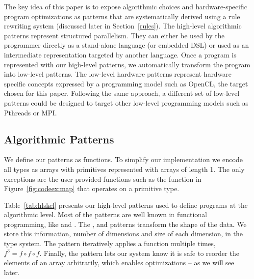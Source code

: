 
The key idea of this paper is to expose algorithmic choices and hardware-specific program optimizations as patterns that are systematically derived using a rule rewriting system (discussed later in Section~\ref{rules}).
The high-level algorithmic patterns represent structured parallelism.
They can either be used by the programmer directly as a stand-alone language (or embedded DSL) or used as an intermediate representation targeted by another language.
Once a program is represented with our high-level patterns, we automatically transform the program into low-level patterns.
The low-level hardware patterns represent hardware specific concepts expressed by a programming model such as OpenCL, the target chosen for this paper.
Following the same approach, a different set of low-level patterns could be designed to target other low-level programming models such as Pthreads or MPI.


\subsection{Algorithmic Patterns}

We define our patterns as functions. %
To simplify our implementation we encode all types as arrays with primitives represented with arrays of length 1.
The only exceptions are the user-provided functions such as the  function in Figure~\ref{fig:codeex:map} that operates on a primitive type.

Table~\ref{tab:hlskel} presents our high-level patterns used to define programs at the algorithmic level.
Most of the patterns are well known in functional programming, like  and .
The ,  and  patterns transform the shape of the data.
We store this information, \ie number of dimensions and size of each dimension, in the type system.
The  pattern iteratively applies a function multiple times, \eg $f^3 = f \circ f \circ f$. %
Finally, the  pattern lets our system know it is safe to
reorder the elements of an array arbitrarily, which enables optimizations -- as we will see later.

